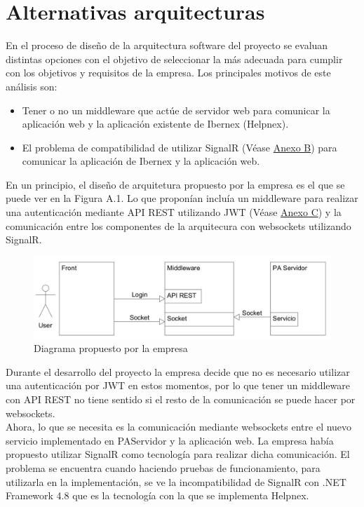 \chapter{Alternativas arquitecturas}
\label{anexo-a}

En el proceso de diseño de la arquitectura software del proyecto se evaluan distintas opciones con el objetivo de seleccionar la más adecuada para cumplir con los objetivos y requisitos de la empresa. Los principales motivos de este análisis son:

\begin{itemize}
    \item Tener o no un middleware que actúe de servidor web para comunicar la aplicación web y la aplicación existente de Ibernex (Helpnex).
    \item El problema de compatibilidad de utilizar SignalR (Véase  \hyperref[anexo-b]{Anexo B}) para comunicar la aplicación de Ibernex y la aplicación web.
\end{itemize}

En un principio, el diseño de arquitetura propuesto por la empresa es el que se puede ver en la Figura A.1. Lo que proponían incluía un middleware para realizar una autenticación mediante API REST utilizando JWT (Véase \hyperref[anexo-c]{Anexo C}) y la comunicación entre los componentes de la arquitecura con websockets utilizando SignalR.  

\begin{figure}[!h]
    \centering
    \includegraphics[width=15cm]{Imagenes/Descripcion-arquitectura}
    \caption{Diagrama propuesto por la empresa}
    \label{fig:descripcion-arquitectura}
\end{figure}

Durante el desarrollo del proyecto la empresa decide que no es necesario utilizar una autenticación por JWT en estos momentos, por lo que tener un middleware con API REST no tiene sentido si el resto de la comunicación se puede hacer por websockets.\\

Ahora, lo que se necesita es la comunicación mediante websockets entre el nuevo servicio implementado en PAServidor y la aplicación web. La empresa había propuesto utilizar SignalR como tecnología para realizar dicha comunicación. El problema se encuentra cuando haciendo pruebas de funcionamiento, para utilizarla en la implementación, se ve la incompatibilidad de SignalR con .NET Framework 4.8 que es la tecnología con la que se implementa Helpnex.\\

